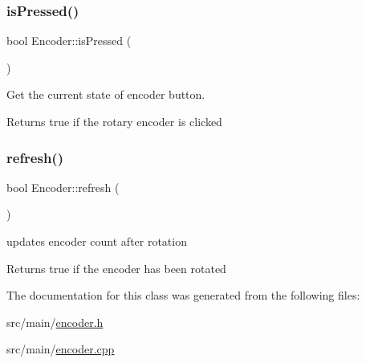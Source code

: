 \subsubsection{\texorpdfstring{is\+Pressed()}{isPressed()}}
{\footnotesize\ttfamily bool Encoder\+::is\+Pressed (\begin{DoxyParamCaption}{ }\end{DoxyParamCaption})}



Get the current state of encoder button. 

\begin{DoxyReturn}{Returns}
true if the rotary encoder is clicked 
\end{DoxyReturn}
\mbox{\label{class_encoder_a85178b6e0978a7c342edbdce308d4abf}} 
\subsubsection{\texorpdfstring{refresh()}{refresh()}}
{\footnotesize\ttfamily bool Encoder\+::refresh (\begin{DoxyParamCaption}{ }\end{DoxyParamCaption})}



updates encoder count after rotation 

\begin{DoxyReturn}{Returns}
true if the encoder has been rotated 
\end{DoxyReturn}


The documentation for this class was generated from the following files\+:\begin{DoxyCompactItemize}
\item 
src/main/\hyperlink{encoder_8h}{encoder.\+h}\item 
src/main/\hyperlink{encoder_8cpp}{encoder.\+cpp}\end{DoxyCompactItemize}
